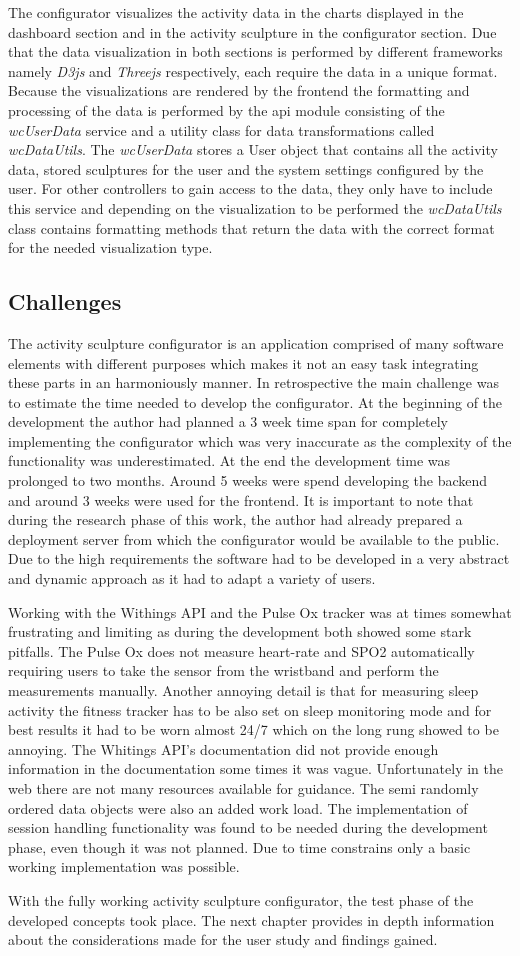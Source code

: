 \documentclass[../medieninformatik-arbeit.tex]{subfiles}
\begin{document}
The configurator visualizes the activity data in the charts displayed in the dashboard section and in the activity sculpture in the configurator section. Due that the data visualization in both sections is performed by different frameworks namely \textit{D3js} and \textit{Threejs} respectively, each require the data in a unique format. Because the visualizations are rendered by the frontend the formatting and processing of the data is performed by the api module consisting of the \textit{wcUserData} service and a utility class for data transformations called \textit{wcDataUtils}. The \textit{wcUserData} stores a User object that contains all the activity data, stored sculptures for the user and the system settings configured by the user. For other controllers to gain access to the data, they only have to include this service and depending on the visualization to be performed the \textit{wcDataUtils} class contains formatting methods that return the data with the correct format for the needed visualization type. 

\subsection{Challenges}
The activity sculpture configurator is an application comprised of many software elements with different purposes which makes it not an easy task integrating these parts in an harmoniously manner. In retrospective the main challenge was to estimate the time needed to develop the configurator. At the beginning of the development the author had planned a 3 week time span for completely implementing the configurator which was very inaccurate as the complexity of the functionality was underestimated. At the end the development time was prolonged to two months. Around 5 weeks were spend developing the backend and around 3 weeks were used for the frontend. It is important to note that during the research phase of this work, the author had already prepared a deployment server from which the configurator would be available to the public. Due to the high requirements the software had to be developed in a very abstract and dynamic approach as it had to adapt a variety of users. 

Working with the Withings API and the Pulse Ox tracker was at times somewhat frustrating and limiting as during the development both showed some stark pitfalls. The Pulse Ox does not measure heart-rate and SPO2 automatically requiring users to take the sensor from the wristband and perform the measurements manually. Another annoying detail is that for measuring sleep activity the fitness tracker has to be also set on sleep monitoring mode and for best results it had to be worn almost 24/7 which on the long rung showed to be annoying. The Whitings API's documentation did not provide enough information in the documentation some times it was vague. Unfortunately in the web there are not many resources available for guidance. The semi randomly ordered data objects were also an added work load. The implementation of session handling functionality was found to be needed during the development phase, even though it was not planned. Due to time constrains only a basic working implementation was possible. 

With the fully working activity sculpture configurator, the test phase of the developed concepts took place. The next chapter provides in depth information about the considerations made for the user study and findings gained. 
\end{document}
